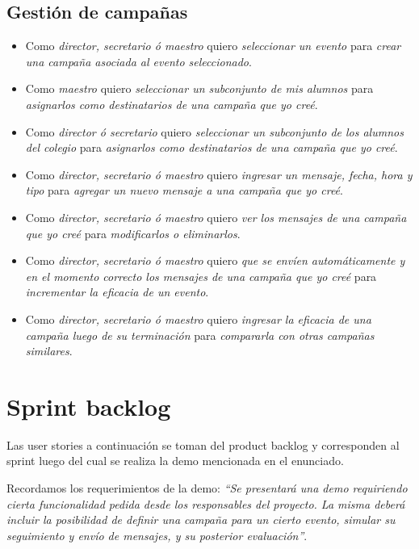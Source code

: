 \documentclass[a4paper, 10pt, twoside]{article}
\newenvironment{stories}{
  \begin{itemize}
}{
  \end{itemize}
}
\newcommand{\story}[3]{
  \item
  Como \emph{#1} quiero \emph{#2} para \emph{#3}.
}
\begin{document}
\subsection{Gestión de campañas}

\begin{stories}
  \story{director, secretario ó maestro}
        {seleccionar un evento}
        {crear una campaña asociada al evento seleccionado}

  \story{maestro}
        {seleccionar un subconjunto de mis alumnos}
        {asignarlos como destinatarios de una campaña que yo creé}

  \story{director ó secretario}
        {seleccionar un subconjunto de los alumnos del colegio}
        {asignarlos como destinatarios de una campaña que yo creé}

  \story{director, secretario ó maestro}
        {ingresar un mensaje, fecha, hora y tipo}
        {agregar un nuevo mensaje a una campaña que yo creé}

  \story{director, secretario ó maestro}
        {ver los mensajes de una campaña que yo creé}
        {modificarlos o eliminarlos}

  \story{director, secretario ó maestro}
        {que se envíen automáticamente y en el momento correcto los mensajes de una campaña que yo creé}
        {incrementar la eficacia de un evento}

  \story{director, secretario ó maestro}
        {ingresar la eficacia de una campaña luego de su terminación}
        {compararla con otras campañas similares}
\end{stories}




\section{Sprint backlog}

Las user stories a continuación se toman del product backlog y corresponden al sprint luego del cual se realiza la demo mencionada en el enunciado.

Recordamos los requerimientos de la demo: \emph{``Se presentará una demo requiriendo cierta funcionalidad pedida desde los responsables del proyecto. La misma deberá incluir la posibilidad de definir una campaña para un cierto evento, simular su seguimiento y envío de mensajes, y su posterior evaluación''}.
\end{document}
